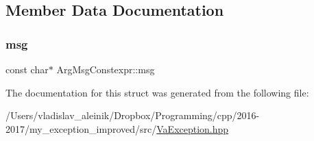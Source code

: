 \subsection{Member Data Documentation}
\mbox{\label{struct_arg_msg_constexpr_af23e14892351bf00276664bcc5e401c0}} 
\subsubsection{\texorpdfstring{msg}{msg}}
{\footnotesize\ttfamily const char$\ast$ Arg\+Msg\+Constexpr\+::msg}



The documentation for this struct was generated from the following file\+:\begin{DoxyCompactItemize}
\item 
/\+Users/vladislav\+\_\+aleinik/\+Dropbox/\+Programming/cpp/2016-\/2017/my\+\_\+exception\+\_\+improved/src/\hyperlink{_va_exception_8hpp}{Va\+Exception.\+hpp}\end{DoxyCompactItemize}
